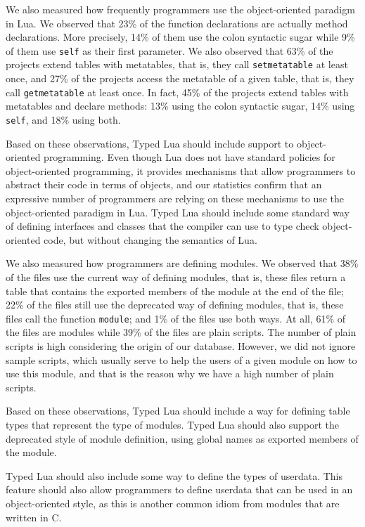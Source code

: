 We also measured how frequently programmers use the object-oriented
paradigm in Lua.
We observed that 23\% of the function declarations are actually
method declarations.
More precisely, 14\% of them use the colon syntactic sugar while
9\% of them use \texttt{self} as their first parameter.
We also observed that 63\% of the projects extend tables with
metatables, that is, they call \texttt{setmetatable} at least once,
and 27\% of the projects access the metatable of a given table,
that is, they call \texttt{getmetatable} at least once.
In fact, 45\% of the projects extend tables with metatables and
declare methods:
13\% using the colon syntactic sugar, 14\% using \texttt{self}, and
18\% using both.

Based on these observations, Typed Lua should include support
to object-oriented programming.
Even though Lua does not have standard policies for object-oriented
programming, it provides mechanisms that allow programmers to
abstract their code in terms of objects, and our statistics confirm
that an expressive number of programmers are relying on these mechanisms
to use the object-oriented paradigm in Lua.
Typed Lua should include some standard way of defining interfaces and classes
that the compiler can use to type check object-oriented code,
but without changing the semantics of Lua.

We also measured how programmers are defining modules.
We observed that 38\% of the files use the current way of defining
modules, that is, these files return a table that contains the
exported members of the module at the end of the file;
22\% of the files still use the deprecated way of defining modules,
that is, these files call the function \texttt{module};
and 1\% of the files use both ways.
At all, 61\% of the files are modules while 39\% of the files are
plain scripts.
The number of plain scripts is high considering the origin of
our database.
However, we did not ignore sample scripts, which usually serve to
help the users of a given module on how to use this module, and
that is the reason why we have a high number of plain scripts.

Based on these observations, Typed Lua should include a way
for defining table types that represent the type of modules.
Typed Lua should also support the deprecated style of module
definition, using global names as exported members of the module.

Typed Lua should also include some way to define the types of
userdata.
This feature should also allow programmers to define userdata
that can be used in an object-oriented style, as this is another
common idiom from modules that are written in C.

